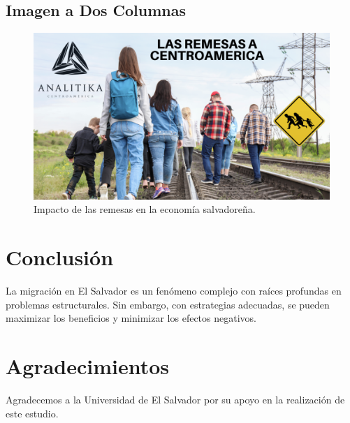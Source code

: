 \documentclass[conference]{IEEEtran}
\begin{document}
\subsection{Imagen a Dos Columnas}
\begin{figure}[t]
\centering
\includegraphics[width=\textwidth]{imagenes/impacto_remesas.png}
\caption{Impacto de las remesas en la economía salvadoreña.}
\label{fig:remesas}
\end{figure}

\section{Conclusión}
La migración en El Salvador es un fenómeno complejo con raíces profundas en problemas estructurales. Sin embargo, con estrategias adecuadas, se pueden maximizar los beneficios y minimizar los efectos negativos.

\section*{Agradecimientos}
Agradecemos a la Universidad de El Salvador por su apoyo en la realización de este estudio.



\end{document}
